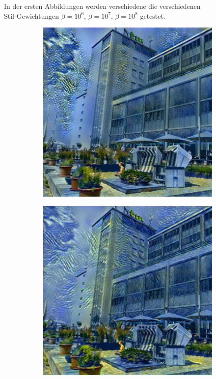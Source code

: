 In der ersten Abbildungen werden verschiedene die verschiedenen  \\
Stil-Gewichtungen $ \beta = 10^{6} $, $ \beta = 10^{7} $, $ \beta = 10^{8} $ getestet.

\begin{figure}[H]
    \centering
    \begin{subfigure}[h]{0.3\textwidth}
        \centering
        \includegraphics[width=\textwidth]{resources/content/output/neural-style/htw-test-1-1.jpg}
    \end{subfigure}
    \begin{subfigure}[h]{0.3\textwidth}
        \centering
        \includegraphics[width=\textwidth]{resources/content/output/neural-style/htw-test-1-2.jpg}

\end{subfigure}
\end{figure}
